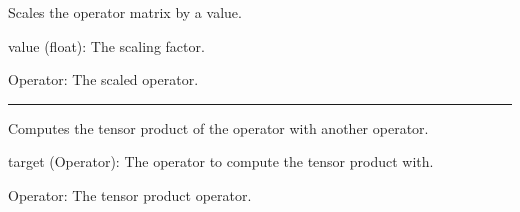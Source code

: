 \documentclass[letterpaper,10pt,english]{sphinxmanual}
\begin{document}
\begin{fulllineitems}
\begin{fulllineitems}
\begin{description}
\end{description}

\end{fulllineitems}


\begin{fulllineitems}
\label{\detokenize{index:utils.tensor.Operator.scale}}
\pysigstartsignatures
{}
\pysigstopsignatures
\sphinxAtStartPar
Scales the operator matrix by a value.
\begin{description}
\sphinxAtStartPar
value (float): The scaling factor.

\sphinxAtStartPar
Operator: The scaled operator.

\end{description}

\end{fulllineitems}



\bigskip\hrule\bigskip


\begin{fulllineitems}
\label{\detokenize{index:utils.tensor.Operator.tensor}}
\pysigstartsignatures
{}
\pysigstopsignatures
\sphinxAtStartPar
Computes the tensor product of the operator with another operator.
\begin{description}
\sphinxAtStartPar
target (Operator): The operator to compute the tensor product with.

\sphinxAtStartPar
Operator: The tensor product operator.

\end{description}

\end{fulllineitems}



\end{fulllineitems}
\end{document}

